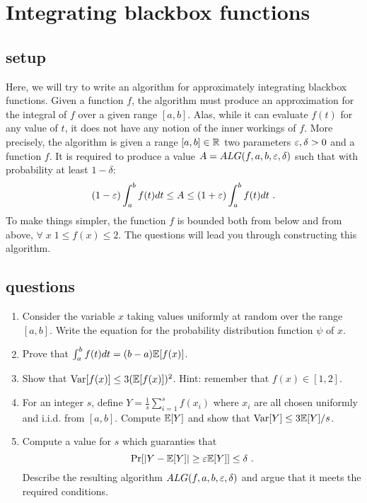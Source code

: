 \documentclass{article}
\begin{document}
\section{Integrating blackbox functions}
\subsection*{setup}
Here, we will try to write an algorithm for approximately integrating blackbox functions.
Given a function $f$, the algorithm must produce an approximation for the integral of $f$ over a given range $[a,b]$.
Alas, while it can evaluate $f(t)$ for any value of $t$, it does not have any notion of the inner workings of $f$. 
More precisely, the algorithm is given a range $[a,b] \in {\mathbb{R}}$ two parameters $\varepsilon, \delta > 0$ and a function $f$.
It is required to produce a value $A = ALG(f,a,b,\varepsilon,\delta)$ such that with probability at least $1 -\delta$:
\[
 (1-\varepsilon) \int_{a}^{b} f(t)dt \le A \le  (1+\varepsilon) \int_{a}^{b} f(t)dt \ . 
\]
To make things simpler, the function $f$ is bounded both from below and from above, $\forall \; x \; 1 \le f(x) \le 2$.
The questions will lead you through constructing this algorithm.

\subsection*{questions}
\begin{enumerate}
\item Consider the variable $x$ taking values uniformly at random over the range $[a,b]$.
Write the equation for the probability distribution function $\psi$ of $x$. 
\item Prove that $\int_{a}^{b}f(t)dt = (b-a){\mathbb E}[f(x)]$.
\item Show that ${\operatorname{Var}}[f(x)] \le 3 ({\mathbb E}[f(x)])^2$. Hint: remember that $f(x) \in [1,2]$.
\item For an integer $s$, define $Y = \frac{1}{s}\sum_{i=1}^{s}f(x_i)$ where $x_i$ are all chosen uniformly and i.i.d. from $[a,b]$.
Compute ${\mathbb E}[Y]$ and show that ${\operatorname{Var}}[Y] \le 3 {\mathbb E}[Y] /s$.
\item Compute a value for $s$ which guaranties that 
\[
\Pr[ |Y -  {\mathbb E}[Y] | \ge \varepsilon {\mathbb E}[Y]] \le \delta \ .
\]
Describe the resulting algorithm $ALG(f,a,b,\varepsilon,\delta)$ and argue that it meets the required conditions.
\end{enumerate}
\pagebreak

\end{document}
